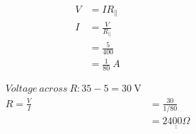 \documentclass[12pt]{article}
\begin{document}
\begin{align*}
	V &=I R_{\|} \\
	I &= \frac{V}{R_{\|}} \\
	&= \frac{5}{400} \\
	&= \frac{1}{80} \ A
\end{align*}


\begin{align*}
	Voltage \ across \ R: 35-5 = \qty{30}{\volt} \\	
		R=\frac{V}{I} &=\frac{30}{1 / 80} \\
		&= \underline{\underline{2400 \Omega}}
\end{align*}
\end{document}
